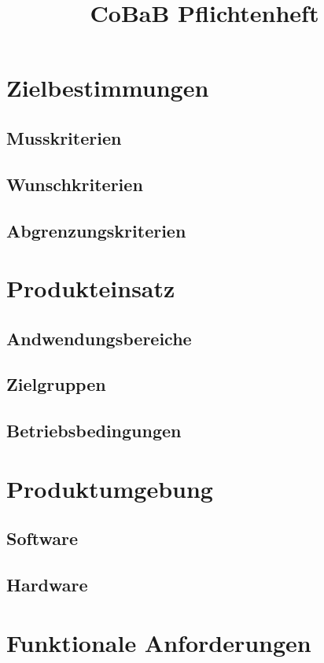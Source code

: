 \documentclass[parskip=full]{scrartcl}
\title{CoBaB Pflichtenheft}
\begin{document}
\maketitle

\section{Zielbestimmungen}
\subsection{Musskriterien}
\subsection{Wunschkriterien}
\subsection{Abgrenzungskriterien}

\section{Produkteinsatz}
\subsection{Andwendungsbereiche}
\subsection{Zielgruppen}
\subsection{Betriebsbedingungen}

\section{Produktumgebung}
\subsection{Software}
\subsection{Hardware}

\section{Funktionale Anforderungen}
\end{document}
